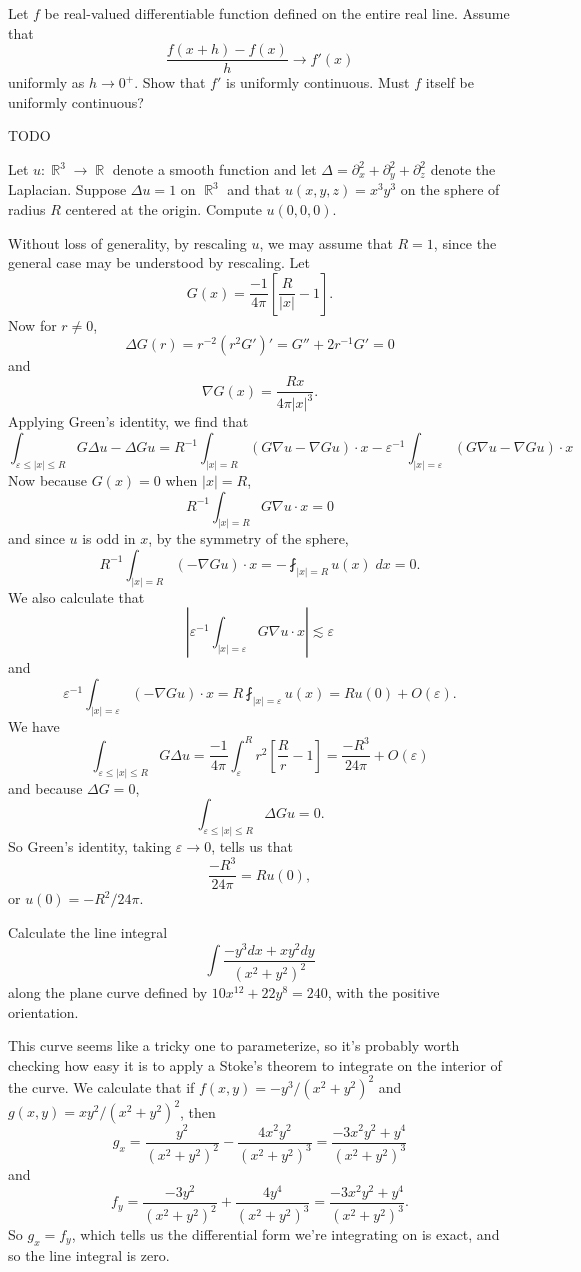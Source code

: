 \documentclass[answers]{exam}
\DeclareMathOperator{\RR}{\mathbb{R}}
\begin{document}
\begin{questions}
\question Let $f$ be real-valued differentiable function defined on the entire real line. Assume that
%
\[ \frac{f(x+h) - f(x)}{h} \to f'(x) \]
%
uniformly as $h \to 0^+$. Show that $f'$ is uniformly continuous. Must $f$ itself be uniformly continuous?
\begin{solution}
	TODO
\end{solution}

\question Let $u: \RR^3 \to \RR$ denote a smooth function and let $\Delta = \partial_x^2 + \partial_y^2 + \partial_z^2$ denote the Laplacian. Suppose $\Delta u = 1$ on $\RR^3$ and that $u(x,y,z) = x^3y^3$ on the sphere of radius $R$ centered at the origin. Compute $u(0,0,0)$.
\begin{solution}
	Without loss of generality, by rescaling $u$, we may assume that $R = 1$, since the general case may be understood by rescaling. Let
	\[ G(x) = \frac{-1}{4\pi} \left[ \frac{R}{|x|} - 1 \right]. \]
	Now for $r \neq 0$,
	\[ \Delta G(r) = r^{-2} (r^2 G')' = G'' + 2r^{-1} G' = 0 \]
	and
	\[ \nabla G(x) = \frac{R x}{4\pi |x|^3}. \]
	Applying Green's identity, we find that
	\[ \int_{\varepsilon \leq |x| \leq R} G \Delta u - \Delta G u = R^{-1} \int_{|x| = R} (G \nabla u - \nabla G u) \cdot x - \varepsilon^{-1} \int_{|x| = \varepsilon} ( G \nabla u - \nabla G u ) \cdot x \]
	Now because $G(x) = 0$ when $|x| = R$,
	\[ R^{-1} \int_{|x| = R} G \nabla u \cdot x = 0 \]
	and since $u$ is odd in $x$, by the symmetry of the sphere,
	\[ R^{-1} \int_{|x| = R} (- \nabla G u) \cdot x = - \fint_{|x| = R} u(x)\; dx = 0. \]
	We also calculate that
	\[ \left| \varepsilon^{-1} \int_{|x| = \varepsilon} G \nabla u \cdot x \right| \lesssim \varepsilon \]
	and
	\[ \varepsilon^{-1} \int_{|x| = \varepsilon} (- \nabla G u) \cdot x = R \fint_{|x| = \varepsilon} u(x) = R u(0) + O(\varepsilon). \]
	We have
	\[ \int_{\varepsilon \leq |x| \leq R} G \Delta u = \frac{-1}{4 \pi} \int_\varepsilon^R r^2 \left[ \frac{R}{r} - 1 \right] = \frac{-R^3}{24 \pi} + O(\varepsilon) \]
	and because $\Delta G = 0$,
	\[ \int_{\varepsilon \leq |x| \leq R} \Delta G u = 0. \]
	So Green's identity, taking $\varepsilon \to 0$, tells us that
	\[ \frac{-R^3}{24 \pi} = R u(0), \]
	or $u(0) = - R^2 / 24 \pi$.
\end{solution}

\question Calculate the line integral
%
\[ \int \frac{-y^3 dx + xy^2 dy}{(x^2 + y^2)^2} \]
%
along the plane curve defined by $10x^{12} + 22 y^8 = 240$, with the positive orientation.
\begin{solution}
	This curve seems like a tricky one to parameterize, so it's probably worth checking how easy it is to apply a Stoke's theorem to integrate on the interior of the curve. We calculate that if $f(x,y) = -y^3 / (x^2 + y^2)^2$ and $g(x,y) = xy^2 / (x^2 + y^2)^2$, then
	\[ g_x = \frac{y^2}{(x^2 + y^2)^2} - \frac{4x^2y^2}{(x^2 + y^2)^3} = \frac{-3x^2y^2 + y^4}{(x^2 + y^2)^3} \]
	and
	\[ f_y = \frac{-3y^2}{(x^2 + y^2)^2} + \frac{4y^4}{(x^2 + y^2)^3} = \frac{-3x^2y^2 + y^4}{(x^2 + y^2)^3}. \]
	So $g_x = f_y$, which tells us the differential form we're integrating on is exact, and so the line integral is zero.
\end{solution}


\end{questions}
\end{document}
